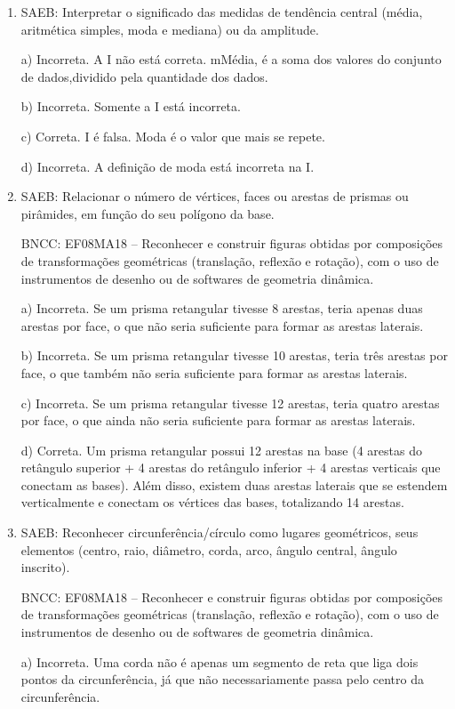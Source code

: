 \begin{enumerate}
\item SAEB: Interpretar o significado das medidas de tendência central (média,
aritmética simples, moda e mediana) ou da amplitude.

a) Incorreta. A I não está correta. mMédia, é a soma dos valores do
conjunto de dados,dividido pela quantidade dos dados.

b) Incorreta. Somente a I está incorreta.

c) Correta. I é falsa. Moda é o valor que mais se repete.

d) Incorreta. A definição de moda está incorreta na I.

\item SAEB: Relacionar o número de vértices, faces ou arestas de prismas ou
pirâmides, em função do seu polígono da base.

BNCC: EF08MA18 -- Reconhecer e construir figuras obtidas por composições
de transformações geométricas (translação, reflexão e rotação), com o
uso de instrumentos de desenho ou de softwares de geometria dinâmica.

a) Incorreta. Se um prisma retangular tivesse 8 arestas, teria
apenas duas arestas por face, o que não seria suficiente para formar as
arestas laterais.

b) Incorreta. Se um prisma retangular tivesse 10 arestas, teria
três arestas por face, o que também não seria suficiente para formar as
arestas laterais.

c) Incorreta. Se um prisma retangular tivesse 12 arestas, teria
quatro arestas por face, o que ainda não seria suficiente para formar as
arestas laterais.

d) Correta. Um prisma retangular possui 12 arestas na base (4
arestas do retângulo superior + 4 arestas do retângulo inferior + 4
arestas verticais que conectam as bases). Além disso, existem duas
arestas laterais que se estendem verticalmente e conectam os vértices
das bases, totalizando 14 arestas.

\item SAEB: Reconhecer circunferência/círculo como lugares geométricos, seus
elementos (centro, raio, diâmetro, corda, arco, ângulo central, ângulo
inscrito).

BNCC: EF08MA18 -- Reconhecer e construir figuras obtidas por composições
de transformações geométricas (translação, reflexão e rotação), com o
uso de instrumentos de desenho ou de softwares de geometria dinâmica.

a) Incorreta. Uma corda não é apenas um segmento de reta que liga
dois pontos da circunferência, já que não necessariamente passa pelo
centro da circunferência.


\end{enumerate}
